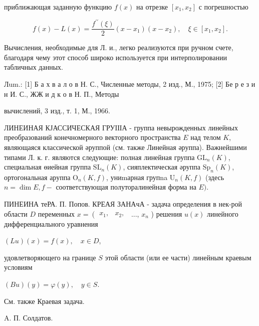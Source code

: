 \documentclass[10pt]{article}
\begin{document}
приближающая заданную функцию $f(x)$ на отрезке $\left[x_{1}, x_{2}\right]$ с погрешностью



\[

f(x)-L(x)=\frac{f^{\prime \prime}(\xi)}{2}\left(x-x_{1}\right)\left(x-x_{2}\right), \quad \xi \in\left[x_{1}, x_{2}\right] .

\]



Вычисления, необходимые для Л. и., легко реализуются при ручном счете, благодаря чему этот способ широко используется при интерполировании табличных данных.



Лum.: [1] Б а х в а л о в Н. С., Численные методы, 2 изд., М., 1975; [2] Бе р е з и н И. С., ЖЖ и д к о в Н. П., Методы

вычислений, 3 изд., т. 1, М., 1966.



ЛИНЕИНАЯ КЈАССИЧЕСКАЯ ГРУІІІА - группа невырожденных линейных преобразований конечномерного векторного пространства $E$ над телом $K$, являющаяся классической әруппой (см. также Линейная әруппа). Важнейшими типами Л. к. г. являются следующие: полная линейная группа $\mathrm{GL}_{n}(K)$, специальная өиейная группа $\mathrm{SL}_{n}(K)$, сияплектическая әруппа $\mathrm{Sp}_{n}(K)$, ортогональная аруппа $\mathrm{O}_{n}(K, f)$, униmарная групna $\mathrm{U}_{n}(K, f)$ (здесь $n=\operatorname{dim} E, f-$ соответствующая полуторалинейная форма на $E)$.



ПИНЕИНА теРА. П. Попов. КРЕАЯ ЗАНАчА - задача определения в нек-рой области $D$ переменных $x=\left(\begin{array}{ll}x_{1}, & x_{2} \text {, }\end{array}\right.$ ..., $x_{n}$ ) решения $u(x)$ линейного дифференциального уравнения



$(L u)(x)=f(x), \quad x \in D$,



удовлетворяющего на границе $S$ этой области (или ее части) линейным краевым условиям



$(B u)(y)=\varphi(y), \quad y \in S$.



См. также Краевая задача.



A. П. Солдатов.
\end{document}

